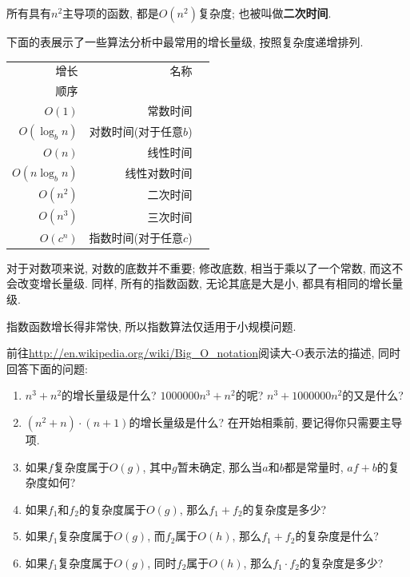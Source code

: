 \documentclass[10pt]{book}
\begin{document}
所有具有$n^2$主导项的函数, 都是$O(n^2)$复杂度; 也被叫做{\bf 二次时间}. 

下面的表展示了一些算法分析中最常用的增长量级, 
按照复杂度递增排列. 

\begin{tabular}{|r|r|r|}
\hline
增长     &   名称      \\
顺序      &               \\
\hline
$O(1)$             & 常数时间 \\
$O(\log_b n)$      & 对数时间(对于任意$b$) \\
$O(n)$             & 线性时间 \\
$O(n \log_b n)$    & 线性对数时间 \\
$O(n^2)$           & 二次时间   \\
$O(n^3)$           & 三次时间   \\
$O(c^n)$           & 指数时间(对于任意$c$)  \\
\hline
\end{tabular}

对于对数项来说, 对数的底数并不重要;
修改底数, 相当于乘以了一个常数, 
而这不会改变增长量级. 
同样, 所有的指数函数, 无论其底是大是小, 都具有相同的增长量级. 

指数函数增长得非常快, 所以指数算法仅适用于小规模问题. 


\begin{exercise}
前往\url{http://en.wikipedia.org/wiki/Big_O_notation}阅读大-O表示法的描述, 
同时回答下面的问题:

\begin{enumerate}
\item $n^3 + n^2$的增长量级是什么? $1000000 n^3 + n^2$的呢?
$n^3 + 1000000 n^2$的又是什么?

\item $(n^2 + n) \cdot (n + 1)$的增长量级是什么? 在开始相乘前, 要记得你只需要主导项. 

\item 如果$f$复杂度属于$O(g)$, 其中$g$暂未确定, 那么当$a$和$b$都是常量时, 
$af+b$的复杂度如何?

\item 如果$f_1$和$f_2$的复杂度属于$O(g)$, 那么$f_1 + f_2$的复杂度是多少?

\item 如果$f_1$复杂度属于$O(g)$, 而$f_2$属于$O(h)$, 那么$f_1 + f_2$的复杂度是什么?

\item 如果$f_1$复杂度属于$O(g)$, 同时$f_2$属于$O(h)$, 那么$f_1 \cdot f_2$的复杂度是多少?
\end{enumerate}

\end{exercise}
\end{document}
